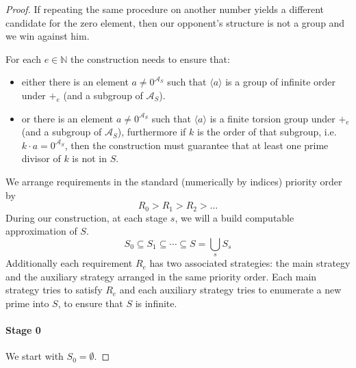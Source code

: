 \documentclass{pracalicmgr2025}
\theoremstyle{plain}            %
\theoremstyle{remark}           %
\theoremstyle{definition}       %
\begin{document}
\begin{proof}
If repeating the same procedure on another number yields a different candidate for the zero element, then our opponent’s structure is not a group and we win against him.


For each $e\in \mathbb{N}$ the construction needs to ensure that:
\begin{itemize}
    \item either there is an element $a \neq 0^{\mathcal{A}_S}$ such that $\langle a \rangle$ is a group of infinite order under $+_e$ (and a subgroup of $\mathcal{A}_S$).
    \item or there is an element $a \neq 0^{\mathcal{A}_S}$ such that $\langle a \rangle$ is a finite torsion group under $+_e$ (and a subgroup of $\mathcal{A}_S$), furthermore if $k$ is the order of that subgroup, i.e. $k\cdot a = 0^{\mathcal{A}_S} $, then the construction must guarantee that at least one prime divisor of $k$ is not in $S$.
\end{itemize}

We arrange requirements in the standard (numerically by indices) priority order by
$$R_0 > R_1 >R_2 >\dots$$
During our construction, at each stage $s$, we will a build computable approximation of $S$.
$$S_0 \subseteq S_1 \subseteq \cdots \subseteq S = \bigcup_s S_s$$
Additionally each requirement $R_e$ has two associated strategies: the main strategy and the auxiliary strategy arranged in the same priority order. Each main strategy tries to satisfy $R_e$ and each auxiliary strategy tries to enumerate a new prime into $S$, to ensure that $S$ is infinite.


\paragraph{Stage 0} 
We start with $S_0=\emptyset$.


\end{proof}
\end{document}
